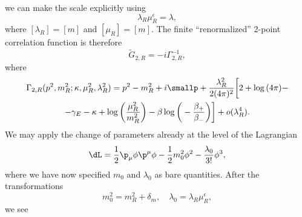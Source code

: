 we can make the scale explicitly using
\begin{equation}
    \lambda_R\mu_R^\epsilon = \lambda,
\end{equation}
where $[\lambda_R] = [m]$ and $[\mu_R] = [m]$. The finite ``renormalized'' 2-point correlation function is therefore
\begin{equation}
    \tilde{G}_{2,R} = -i\Gamma_{2,R}^{-1},
\end{equation}
where
\begin{multline}
\label{eq: Gamma_2R}
    \Gamma_{2,R}(p^2,m_R^2;\kappa,\mu_R^2,\lambda_R^2) = p^2 - m_R^2 + i\smallp + \frac{\lambda_R^2}{2(4\pi)^2}\bigg[2 + \log{(4\pi)} - \\ - \gamma_E - \kappa + \log{\bigg(\frac{\mu_R^2}{m_R^2}\bigg)} - \beta\log{\bigg(-\frac{\beta_+}{\beta_-}\bigg)}\bigg] + o(\lambda_R^4).
\end{multline}
We may apply the change of parameters already at the level of the Lagrangian
\begin{equation}
    \dL = \frac{1}{2}\p_\mu\phi\p^\mu\phi - \frac{1}{2}m_0^2\phi^2 - \frac{\lambda_0}{3!}\phi^3,
\end{equation}
where we have now specified $m_0$ and $\lambda_0$ as bare quantities. After the transformations
\begin{equation}
    m_0^2 = m_R^2 +\delta_{m},\quad \lambda_0 = \lambda_R\mu_R^\epsilon,
\end{equation}
we see

